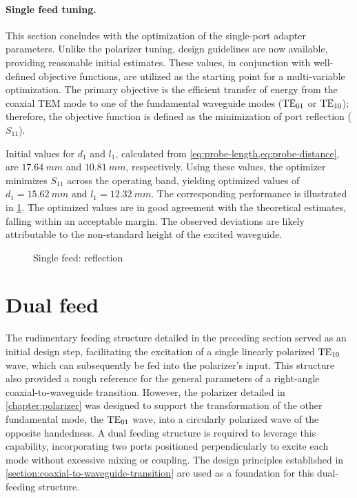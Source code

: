 \documentclass[11pt,a4paper,twoside,openany]{report}
\begin{document}
\paragraph{Single feed tuning.} This section concludes with the optimization of the single-port adapter parameters. Unlike the polarizer tuning, design guidelines are now available, providing reasonable initial estimates. These values, in conjunction with well-defined objective functions, are utilized as the starting point for a multi-variable optimization. The primary objective is the efficient transfer of energy from the coaxial TEM mode to one of the fundamental waveguide modes ($\text{TE}_{01}$ or $\text{TE}_{10}$); therefore, the objective function is defined as the minimization of port reflection ($S_{11}$).

Initial values for $d_1$ and $l_1$, calculated from \cref{eq:probe-length,eq:probe-distance}, are $\qty{17.64}{mm}$ and $\qty{10.81}{mm}$, respectively. Using these values, the optimizer minimizes $S_{11}$ across the operating band, yielding optimized values of $d_1 = \qty{15.62}{mm}$ and $l_1 = \qty{12.32}{mm}$. The corresponding performance is illustrated in \cref{fig:single-feed-reflection}. The optimized values are in good agreement with the theoretical estimates, falling within an acceptable margin. The observed deviations are likely attributable to the non-standard height of the excited waveguide.

\begin{figure}[!ht]
    \centering
    
    \caption{\label{fig:single-feed-reflection}Single feed: reflection}
\end{figure}

\section{Dual feed}
\label{section:dual-feed}
The rudimentary feeding structure detailed in the preceding section served as an initial design step, facilitating the excitation of a single linearly polarized $\text{TE}_{10}$ wave, which can subsequently be fed into the polarizer's input. This structure also provided a rough reference for the general parameters of a right-angle coaxial-to-waveguide transition. However, the polarizer detailed in \cref{chapter:polarizer} was designed to support the transformation of the other fundamental mode, the $\text{TE}_{01}$ wave, into a circularly polarized wave of the opposite handedness. A dual feeding structure is required to leverage this capability, incorporating two ports positioned perpendicularly to excite each mode without excessive mixing or coupling. The design principles established in \cref{section:coaxial-to-waveguide-transition} are used as a foundation for this dual-feeding structure.
\end{document}
